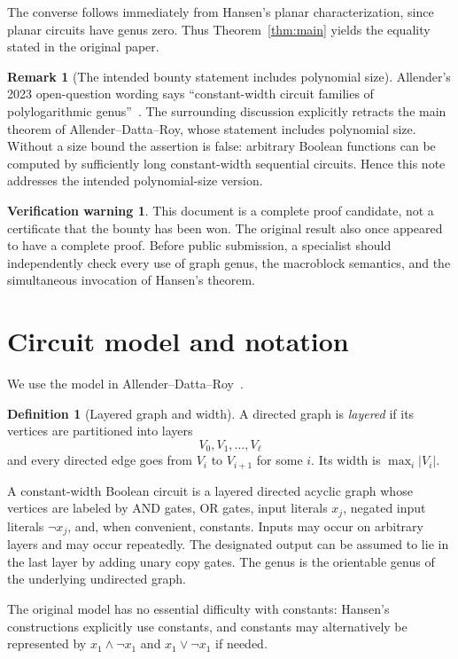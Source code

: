 \documentclass[11pt]{article}
\theoremstyle{definition}
\newtheorem{definition}[theorem]{Definition}
\newtheorem{remark}[theorem]{Remark}
\newtheorem{warning}[theorem]{Verification warning}
\begin{document}
The converse follows immediately from Hansen's planar characterization, since planar circuits have genus zero. Thus Theorem~\ref{thm:main} yields the equality stated in the original paper.

\begin{remark}[The intended bounty statement includes polynomial size]
Allender's 2023 open-question wording says ``constant-width circuit families of polylogarithmic genus''~\cite{Allender2023}. The surrounding discussion explicitly retracts the main theorem of Allender--Datta--Roy, whose statement includes polynomial size. Without a size bound the assertion is false: arbitrary Boolean functions can be computed by sufficiently long constant-width sequential circuits. Hence this note addresses the intended polynomial-size version.
\end{remark}

\begin{warning}
This document is a complete proof candidate, not a certificate that the bounty has been won. The original result also once appeared to have a complete proof. Before public submission, a specialist should independently check every use of graph genus, the macroblock semantics, and the simultaneous invocation of Hansen's theorem.
\end{warning}

\section{Circuit model and notation}

We use the model in Allender--Datta--Roy~\cite{ADR2005,ECCC2004}.

\begin{definition}[Layered graph and width]
A directed graph is \emph{layered} if its vertices are partitioned into layers
\[
  V_0,V_1,\ldots,V_\ell
\]
and every directed edge goes from $V_i$ to $V_{i+1}$ for some $i$. Its width is $\max_i |V_i|$.
\end{definition}

A constant-width Boolean circuit is a layered directed acyclic graph whose vertices are labeled by AND gates, OR gates, input literals $x_j$, negated input literals $\neg x_j$, and, when convenient, constants. Inputs may occur on arbitrary layers and may occur repeatedly. The designated output can be assumed to lie in the last layer by adding unary copy gates. The genus is the orientable genus of the underlying undirected graph.

The original model has no essential difficulty with constants: Hansen's constructions explicitly use constants, and constants may alternatively be represented by $x_1\wedge\neg x_1$ and $x_1\vee\neg x_1$ if needed.
\end{document}
